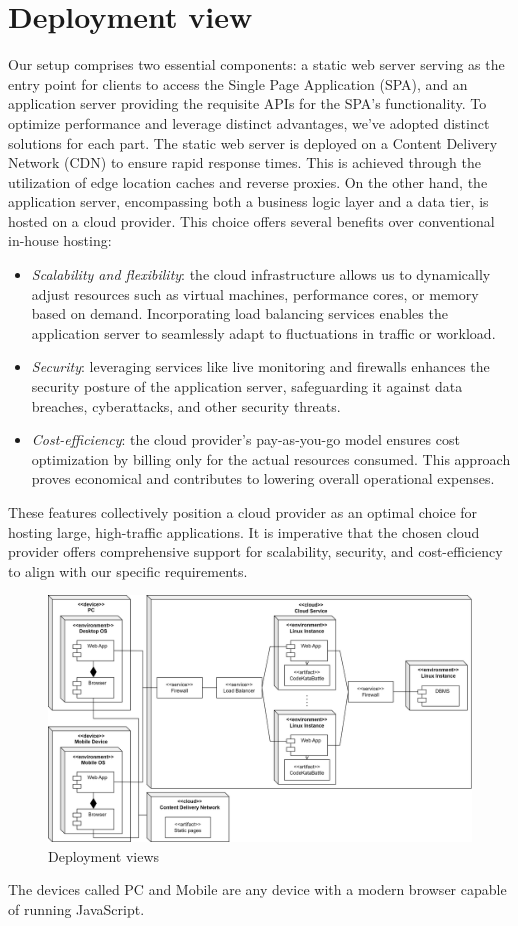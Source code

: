 \documentclass[12pt, a4paper]{report}
\begin{document}
    \section{Deployment view}
    Our setup comprises two essential components: a static web server serving as the entry point for clients to access the Single Page Application (SPA), and an application server providing the requisite APIs for the SPA's functionality. 
    To optimize performance and leverage distinct advantages, we've adopted distinct solutions for each part.
    The static web server is deployed on a Content Delivery Network (CDN) to ensure rapid response times. 
    This is achieved through the utilization of edge location caches and reverse proxies. 
    On the other hand, the application server, encompassing both a business logic layer and a data tier, is hosted on a cloud provider. 
    This choice offers several benefits over conventional in-house hosting:
    \begin{itemize}
        \item \textit{Scalability and flexibility}: the cloud infrastructure allows us to dynamically adjust resources such as virtual machines, performance cores, or memory based on demand. Incorporating load balancing services enables the application server to seamlessly adapt to fluctuations in traffic or workload.
        \item \textit{Security}: leveraging services like live monitoring and firewalls enhances the security posture of the application server, safeguarding it against data breaches, cyberattacks, and other security threats.
        \item \textit{Cost-efficiency}: the cloud provider's pay-as-you-go model ensures cost optimization by billing only for the actual resources consumed. This approach proves economical and contributes to lowering overall operational expenses.
    \end{itemize}
    These features collectively position a cloud provider as an optimal choice for hosting large, high-traffic applications. 
    It is imperative that the chosen cloud provider offers comprehensive support for scalability, security, and cost-efficiency to align with our specific requirements.
    \begin{figure}[H]
        \centering
        \includegraphics[width=0.9\linewidth]{images/deployment_view.png}
        \caption{Deployment views}
    \end{figure}
    The devices called PC and Mobile are any device with a modern browser capable of running JavaScript. 
    
\end{document}
